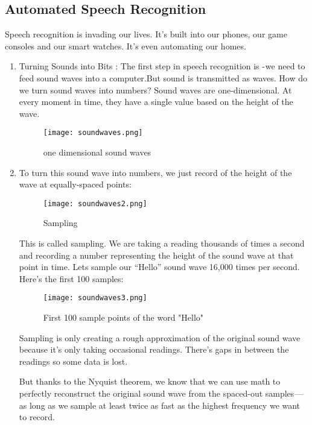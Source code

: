 \documentclass[12pt,a4paper]{article}
\begin{document}
\newpage
\begin{center}
\section{Automated Speech Recognition}
\end{center}
Speech recognition is invading our lives. It’s built into our phones, our game consoles and our smart watches. It’s even automating our homes.

\begin{enumerate}
\item Turning Sounds into Bits :
The first step in speech recognition is - we need to feed sound waves into a computer.But sound is transmitted as waves. How do we turn sound waves into numbers?
Sound waves are one-dimensional. At every moment in time, they have a single value based on the height of the wave. 

\begin{figure}[h]
	\centering
	\texttt{[image: soundwaves.png]}
	\caption{one dimensional sound waves}
\end{figure}

\par 
\item To turn this sound wave into numbers, we just record of the height of the wave at equally-spaced points:

\begin{figure}[h]
	\centering
	\texttt{[image: soundwaves2.png]}
	\caption{Sampling}
\end{figure}

\par 
This is called sampling. We are taking a reading thousands of times a second and recording a number representing the height of the sound wave at that point in time.
Lets sample our “Hello” sound wave 16,000 times per second. Here’s the first 100 samples:

\begin{figure}[h]
	\centering
	\texttt{[image: soundwaves3.png]}
	\caption{First 100 sample points of the word "Hello"}
\end{figure}
 
\newpage 

\par 
Sampling is only creating a rough approximation of the original sound wave because it’s only taking occasional readings. There’s gaps in between the readings so some data is lost.

But thanks to the Nyquist theorem, we know that we can use math to perfectly reconstruct the original sound wave from the spaced-out samples — as long as we sample at least twice as fast as the highest frequency we want to record.


\end{enumerate}
\end{document}
